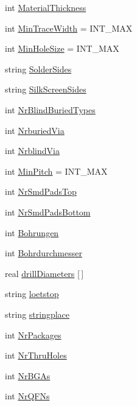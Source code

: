\begin{DoxyCompactItemize}
int \hyperlink{_l_p-_daten_8ulp_a1edf6e298013c81bc3b0c06503341a9e}{Material\+Thickness}
\item 
int \hyperlink{_l_p-_daten_8ulp_acbf2bff16d118b227bd700f39efbc19a}{Min\+Trace\+Width} = I\+N\+T\+\_\+\+M\+A\+X
\item 
int \hyperlink{_l_p-_daten_8ulp_afd98e8c3d97718929a30d66e4c2600ea}{Min\+Hole\+Size} = I\+N\+T\+\_\+\+M\+A\+X
\item 
string \hyperlink{_l_p-_daten_8ulp_a327297b10a43bf8d17cec85de6cfa488}{Solder\+Sides}
\item 
string \hyperlink{_l_p-_daten_8ulp_a068caacbc00a614d6a25116869947d1d}{Silk\+Screen\+Sides}
\item 
int \hyperlink{_l_p-_daten_8ulp_a9ddb3d90ec1e540b0c848b2b44331e19}{Nr\+Blind\+Buried\+Types}
\item 
int \hyperlink{_l_p-_daten_8ulp_a5c7a069806cc36e46a3fce3994c920f3}{Nrburied\+Via}
\item 
int \hyperlink{_l_p-_daten_8ulp_a401b71713346f3c79eedb1f2113c6447}{Nrblind\+Via}
\item 
int \hyperlink{_l_p-_daten_8ulp_a1af335d5e5479a7d171c804c964acb09}{Min\+Pitch} = I\+N\+T\+\_\+\+M\+A\+X
\item 
int \hyperlink{_l_p-_daten_8ulp_a4904b3dd111d987f638dee0ff3dc9c94}{Nr\+Smd\+Pads\+Top}
\item 
int \hyperlink{_l_p-_daten_8ulp_a105dcfe5e158f7f55cf8c729b9332d98}{Nr\+Smd\+Pads\+Bottom}
\item 
int \hyperlink{_l_p-_daten_8ulp_aa00dd541f257a5406d5af13d12aeddaf}{Bohrungen}
\item 
int \hyperlink{_l_p-_daten_8ulp_a335506fe28ba5c545c5bc50350dae9bb}{Bohrdurchmesser}
\item 
real \hyperlink{_l_p-_daten_8ulp_a24c382e25732f4291864d6a09a2ee2e8}{drill\+Diameters} \mbox{[}$\,$\mbox{]}
\item 
string \hyperlink{_l_p-_daten_8ulp_a0896ff121ea65c7d3f5033c3aa45ce86}{loetstop}
\item 
string \hyperlink{_l_p-_daten_8ulp_a335f3f5797df717de135253cb99f2173}{stringplace}
\item 
int \hyperlink{_l_p-_daten_8ulp_aaab850437635db44a15b39d0f6bb95c8}{Nr\+Packages}
\item 
int \hyperlink{_l_p-_daten_8ulp_a278e43783e245ada15421e20f92709ab}{Nr\+Thru\+Holes}
\item 
int \hyperlink{_l_p-_daten_8ulp_a24f35fb03d408576d550fd7f0863f451}{Nr\+B\+G\+As}
\item 
int \hyperlink{_l_p-_daten_8ulp_af84a85c1781d94cf67473f876c6ed7ef}{Nr\+Q\+F\+Ns}

\end{DoxyCompactItemize}
